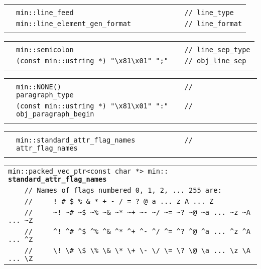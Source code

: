 \documentclass[12pt]{article}
\makeatletter
\newcommand{\TT}[1]{{\tt \bfseries #1}}
\newcommand{\ttindex}[1]{\index{#1@{\tt #1}}}
\newcommand{\EOL}{\penalty \exhyphenpenalty}
\newenvironment{indpar}[1][0.3in]%
	{\begin{list}{}%
		     {\setlength{\itemsep}{0in}%
		      \setlength{\topsep}{0in}%
		      \setlength{\parsep}{1ex}%
		      \setlength{\labelwidth}{#1}%
		      \setlength{\leftmargin}{#1}%
		      \addtolength{\leftmargin}{\labelsep}}%
	 \item}%
	{\end{list}}
\newcommand{\LABEL}[1]{\label{#1}}
\newlength{\ARGBREAKLENGTH}
\newcommand{\ARGBREAK}[1][\ARGBREAKLENGTH]{\\&\hspace*{#1}}
\newcommand{\MINKEY}[1]%
	   {\TT{#1}\ttindex{min::#1}\ttindex{#1}}
\makeatother
\begin{document}
\begin{indpar}[1em]
\vspace{-4ex}\begin{tabular}{r@{}l}\hspace*{0.1in}\ARGBREAK
\verb|min::line_feed                           // line_type|\ARGBREAK
\verb|min::line_element_gen_format             // line_format|\ARGBREAK
\end{tabular}

\vspace{-4ex}\begin{tabular}{r@{}l}\hspace*{0.1in}\ARGBREAK
\verb|min::semicolon                           // line_sep_type|\ARGBREAK
\verb|(const min::ustring *) "\x81\x01" ";"    // obj_line_sep|\ARGBREAK
\end{tabular}

\vspace{-4ex}\begin{tabular}{r@{}l}\hspace*{0.1in}\ARGBREAK
\verb|min::NONE()                              // paragraph_type|\ARGBREAK
\verb|(const min::ustring *) "\x81\x01" ":"    // obj_paragraph_begin|\ARGBREAK
\end{tabular}

\vspace{-4ex}\begin{tabular}{r@{}l}\hspace*{0.1in}\ARGBREAK
\verb|min::standard_attr_flag_names            // attr_flag_names|\ARGBREAK
\end{tabular}\end{indpar}

\begin{indpar}[1em]\begin{tabular}{l}
\verb|min::packed_vec_ptr<const char *> min::|%
    \MINKEY{standard\_\EOL attr\_\EOL flag\_\EOL names}
\LABEL{MIN::STANDARD_ATTR_FLAG_NAMES} \\
\verb|    // Names of flags numbered 0, 1, 2, ... 255 are:| \\
\verb|    //     ! # $ % & * + - / = ? @ a ... z A ... Z| \\
\verb|    //     ~! ~# ~$ ~% ~& ~* ~+ ~- ~/ ~= ~? ~@ ~a ... ~z ~A ... ~Z| \\
\verb|    //     ^! ^# ^$ ^% ^& ^* ^+ ^- ^/ ^= ^? ^@ ^a ... ^z ^A ... ^Z| \\
\verb|    //     \! \# \$ \% \& \* \+ \- \/ \= \? \@ \a ... \z \A ... \Z| \\
\end{tabular}\end{indpar}
\end{document}

